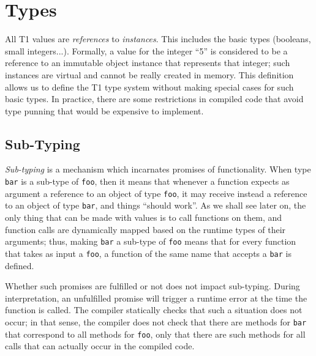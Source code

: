 \section{Types}\label{types}

All T1 values are \emph{references} to \emph{instances}. This includes
the basic types (booleans, small integers...). Formally, a value for the
integer ``5'' is considered to be a reference to an immutable object
instance that represents that integer; such instances are virtual and
cannot be really created in memory. This definition allows us to define
the T1 type system without making special cases for such basic types. In
practice, there are some restrictions in compiled code that avoid type
punning that would be expensive to implement.

\subsection{Sub-Typing}

\emph{Sub-typing} is a mechanism which incarnates promises of
functionality. When type \verb|bar| is a sub-type of \verb|foo|, then it
means that whenever a function expects as argument a reference to an
object of type \verb|foo|, it may receive instead a reference to an
object of type \verb|bar|, and things ``should work''. As we shall see
later on, the only thing that can be made with values is to call
functions on them, and function calls are dynamically mapped based on
the runtime types of their arguments; thus, making \verb|bar| a sub-type
of \verb|foo| means that for every function that takes as input a
\verb|foo|, a function of the same name that accepts a \verb|bar| is
defined.

Whether such promises are fulfilled or not does not impact sub-typing.
During interpretation, an unfulfilled promise will trigger a runtime
error at the time the function is called. The compiler statically checks
that such a situation does not occur; in that sense, the compiler does
not check that there are methods for \verb|bar| that correspond to all
methods for \verb|foo|, only that there are such methods for all calls
that can actually occur in the compiled code.

